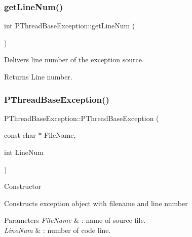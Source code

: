 \subsubsection{\texorpdfstring{get\+Line\+Num()}{getLineNum()}}
{\footnotesize\ttfamily int P\+Thread\+Base\+Exception\+::get\+Line\+Num (\begin{DoxyParamCaption}{ }\end{DoxyParamCaption})\hspace{0.3cm}{\ttfamily [inline]}}

Delivers line number of the exception source. \begin{DoxyReturn}{Returns}
Line number. 
\end{DoxyReturn}
\mbox{\label{group__EXCEPT__GROUP_ga479c992ccbf4a39cd707a27906925601}} 
\subsubsection{\texorpdfstring{P\+Thread\+Base\+Exception()}{PThreadBaseException()}\hspace{0.1cm}{\footnotesize\ttfamily [1/2]}}
{\footnotesize\ttfamily P\+Thread\+Base\+Exception\+::\+P\+Thread\+Base\+Exception (\begin{DoxyParamCaption}\item[{const char $\ast$}]{File\+Name,  }\item[{int}]{Line\+Num }\end{DoxyParamCaption})\hspace{0.3cm}{\ttfamily [inline]}}

Constructor

Constructs exception object with filename and line number 
\begin{DoxyParams}{Parameters}
{\em File\+Name} & \+: name of source file. \\
\hline
{\em Line\+Num} & \+: number of code line. \\
\hline
\end{DoxyParams}
\mbox{\label{group__EXCEPT__GROUP_gaf6dded31d5ab6283d588f99a702241ec}} 

